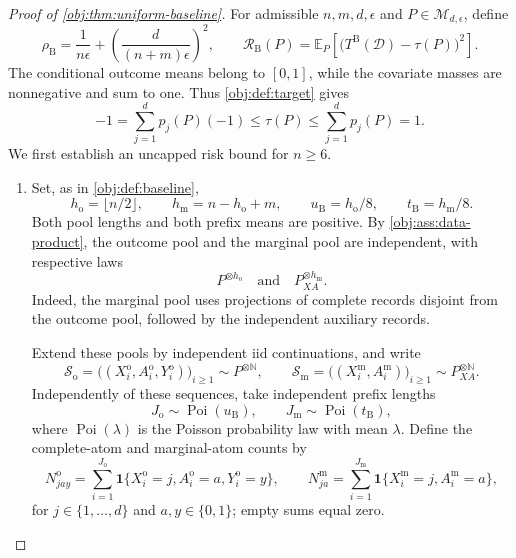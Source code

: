 \begin{proof}[Proof of \cref{obj:thm:uniform-baseline}]
For admissible \(n,m,d,\epsilon\) and \(P\in\mathcal M_{d,\epsilon}\), define
\[
\rho_{\mathrm B}
=
\frac{1}{n\epsilon}
+
\left(\frac{d}{(n+m)\epsilon}\right)^2,
\qquad
\mathcal R_{\mathrm B}(P)
=
\mathbb E_P\!\left[
\bigl(T^{\mathrm B}(\mathcal D)-\tau(P)\bigr)^2
\right].
\]
The conditional outcome means belong to \([0,1]\), while the covariate masses are nonnegative and sum to one. Thus \cref{obj:def:target} gives
\[
-1
=
\sum_{j=1}^d p_j(P)(-1)
\le \tau(P)
\le
\sum_{j=1}^d p_j(P)
=
1.
\]
We first establish an uncapped risk bound for \(n\ge6\).

\begin{enumerate}
\item
Set, as in \cref{obj:def:baseline},
\[
h_{\mathrm o}=\lfloor n/2\rfloor,
\qquad
h_{\mathrm m}=n-h_{\mathrm o}+m,
\qquad
u_{\mathrm B}=h_{\mathrm o}/8,
\qquad
t_{\mathrm B}=h_{\mathrm m}/8.
\]
Both pool lengths and both prefix means are positive. By
\cref{obj:ass:data-product}, the outcome pool and the marginal pool are independent, with respective laws
\[
P^{\otimes h_{\mathrm o}}
\quad\text{and}\quad
P_{XA}^{\otimes h_{\mathrm m}}.
\]
Indeed, the marginal pool uses projections of complete records disjoint from the outcome pool, followed by the independent auxiliary records.

Extend these pools by independent iid continuations, and write
\[
\mathcal S_{\mathrm o}
=
\bigl((X_i^{\mathrm o},A_i^{\mathrm o},Y_i^{\mathrm o})\bigr)_{i\ge1}
\sim P^{\otimes\mathbb N},
\qquad
\mathcal S_{\mathrm m}
=
\bigl((X_i^{\mathrm m},A_i^{\mathrm m})\bigr)_{i\ge1}
\sim P_{XA}^{\otimes\mathbb N}.
\]
Independently of these sequences, take independent prefix lengths
\[
J_{\mathrm o}\sim\operatorname{Poi}(u_{\mathrm B}),
\qquad
J_{\mathrm m}\sim\operatorname{Poi}(t_{\mathrm B}),
\]
where \(\operatorname{Poi}(\lambda)\) is the Poisson probability law with mean \(\lambda\). Define the complete-atom and marginal-atom counts by
\[
N_{jay}^{\mathrm o}
=
\sum_{i=1}^{J_{\mathrm o}}
\mathbf1\{X_i^{\mathrm o}=j,A_i^{\mathrm o}=a,Y_i^{\mathrm o}=y\},
\qquad
N_{ja}^{\mathrm m}
=
\sum_{i=1}^{J_{\mathrm m}}
\mathbf1\{X_i^{\mathrm m}=j,A_i^{\mathrm m}=a\},
\]
for \(j\in\{1,\ldots,d\}\) and \(a,y\in\{0,1\}\); empty sums equal zero.


\end{enumerate}
\end{proof}

